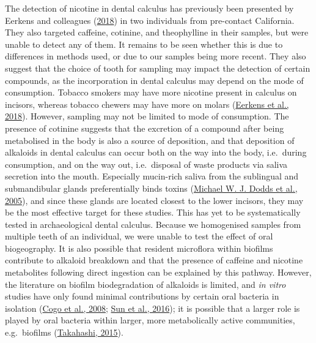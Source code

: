 \documentclass[
  letterpaper,
]{book}
\begin{document}
The detection of nicotine in dental calculus has previously been
presented by Eerkens and colleagues
(\protect\hyperlink{ref-eerkensDentalCalculus2018}{2018}) in two
individuals from pre-contact California. They also targeted caffeine,
cotinine, and theophylline in their samples, but were unable to detect
any of them. It remains to be seen whether this is due to differences in
methods used, or due to our samples being more recent. They also suggest
that the choice of tooth for sampling may impact the detection of
certain compounds, as the incorporation in dental calculus may depend on
the mode of consumption. Tobacco smokers may have more nicotine present
in calculus on incisors, whereas tobacco chewers may have more on molars
(\protect\hyperlink{ref-eerkensDentalCalculus2018}{Eerkens et al.,
2018}). However, sampling may not be limited to mode of consumption. The
presence of cotinine suggests that the excretion of a compound after
being metabolised in the body is also a source of deposition, and that
deposition of alkaloids in dental calculus can occur both on the way
into the body, i.e.~during consumption, and on the way out,
i.e.~disposal of waste products via saliva secretion into the mouth.
Especially mucin-rich saliva from the sublingual and submandibular
glands preferentially binds toxins
(\protect\hyperlink{ref-doddsHealthBenefits2005}{Michael W. J. Dodds et
al., 2005}), and since these glands are located closest to the lower
incisors, they may be the most effective target for these studies. This
has yet to be systematically tested in archaeological dental calculus.
Because we homogenised samples from multiple teeth of an individual, we
were unable to test the effect of oral biogeography. It is also possible
that resident microflora within biofilms contribute to alkaloid
breakdown and that the presence of caffeine and nicotine metabolites
following direct ingestion can be explained by this pathway. However,
the literature on biofilm biodegradation of alkaloids is limited, and
\emph{in vitro} studies have only found minimal contributions by certain
oral bacteria in isolation
(\protect\hyperlink{ref-cogoVitroEvaluation2008}{Cogo et al., 2008};
\protect\hyperlink{ref-sunMetabolomicsEvaluation2016}{Sun et al.,
2016}); it is possible that a larger role is played by oral bacteria
within larger, more metabolically active communities, e.g.~biofilms
(\protect\hyperlink{ref-takahashiOralMicrobiome2015}{Takahashi, 2015}).
\end{document}
